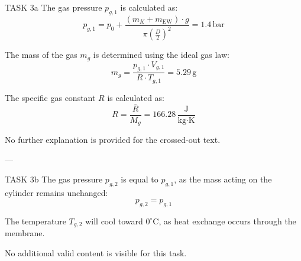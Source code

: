 TASK 3a  
The gas pressure \( p_{g,1} \) is calculated as:  
\[
p_{g,1} = p_0 + \frac{(m_K + m_{\text{EW}}) \cdot g}{\pi \left( \frac{D}{2} \right)^2} = 1.4 \, \text{bar}
\]  

The mass of the gas \( m_g \) is determined using the ideal gas law:  
\[
m_g = \frac{p_{g,1} \cdot V_{g,1}}{R \cdot T_{g,1}} = 5.29 \, \text{g}
\]  

The specific gas constant \( R \) is calculated as:  
\[
R = \frac{\bar{R}}{M_g} = 166.28 \, \frac{\text{J}}{\text{kg·K}}
\]  

No further explanation is provided for the crossed-out text.  

---

TASK 3b  
The gas pressure \( p_{g,2} \) is equal to \( p_{g,1} \), as the mass acting on the cylinder remains unchanged:  
\[
p_{g,2} = p_{g,1}
\]  

The temperature \( T_{g,2} \) will cool toward \( 0^\circ\text{C} \), as heat exchange occurs through the membrane.  

No additional valid content is visible for this task.  